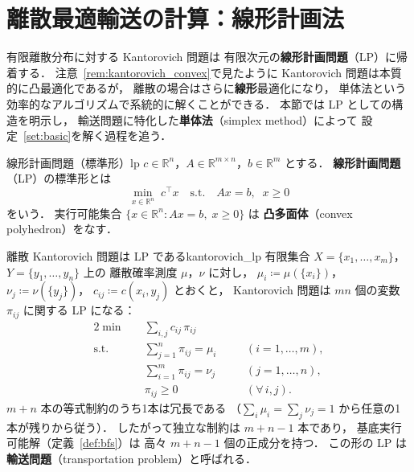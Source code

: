 \documentclass[uplatex, dvipdfmx]{jsarticle}
\begin{document}
\section{離散最適輸送の計算：線形計画法}

有限離散分布に対する Kantorovich 問題は
有限次元の\textbf{線形計画問題}（LP）に帰着する．
注意~\ref{rem:kantorovich_convex}で見たように
Kantorovich 問題は本質的に凸最適化であるが，
離散の場合はさらに\textbf{線形}最適化になり，
単体法という効率的なアルゴリズムで系統的に解くことができる．
本節では LP としての構造を明示し，
輸送問題に特化した\textbf{単体法}（simplex method）によって
設定~\ref{set:basic}を解く過程を追う．

\begin{definition}{線形計画問題（標準形）}{lp}
$c\in\mathbb{R}^n$，$A\in\mathbb{R}^{m\times n}$，$b\in\mathbb{R}^m$ とする．
\textbf{線形計画問題}（LP）の標準形とは
\[
  \min_{x\in\mathbb{R}^n}\; c^\top x
  \quad\text{s.t.}\quad Ax=b,\;\; x\ge 0
\]
をいう．
実行可能集合 $\{x\in\mathbb{R}^n : Ax=b,\;x\ge 0\}$ は
\textbf{凸多面体}（convex polyhedron）をなす．
\end{definition}

\begin{remark}{離散 Kantorovich 問題は LP である}{kantorovich_lp}
有限集合 $X=\{x_1,\ldots,x_m\}$，$Y=\{y_1,\ldots,y_n\}$ 上の
離散確率測度 $\mu$，$\nu$ に対し，
$\mu_i\coloneqq\mu(\{x_i\})$，$\nu_j\coloneqq\nu(\{y_j\})$，
$c_{ij}\coloneqq c(x_i,y_j)$ とおくと，
Kantorovich 問題は $mn$ 個の変数 $\pi_{ij}$ に関する LP になる：
\begin{alignat*}{2}
  \min\quad & \textstyle\sum_{i,j} c_{ij}\,\pi_{ij} \\
  \text{s.t.}\quad
    & \textstyle\sum_{j=1}^{n}\pi_{ij} = \mu_i &\quad& (i=1,\ldots,m), \\
    & \textstyle\sum_{i=1}^{m}\pi_{ij} = \nu_j &\quad& (j=1,\ldots,n), \\
    & \pi_{ij}\ge 0 &\quad& (\forall\,i,j).
\end{alignat*}
$m+n$ 本の等式制約のうち1本は冗長である
（$\sum_i\mu_i=\sum_j\nu_j=1$ から任意の1本が残りから従う）．
したがって独立な制約は $m+n-1$ 本であり，
基底実行可能解（定義~\ref{def:bfs}）は
高々 $m+n-1$ 個の正成分を持つ．
この形の LP は\textbf{輸送問題}（transportation problem）と呼ばれる．
\end{remark}
\end{document}
